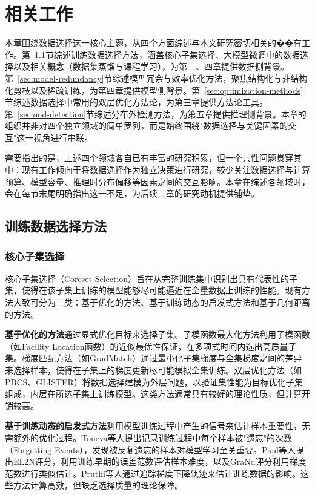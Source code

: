 \chapter{相关工作}

本章围绕数据选择这一核心主题，从四个方面综述与本文研究密切相关的��有工作。第~\ref{sec:training-data-selection}节综述训练数据选择方法，涵盖核心子集选择、大模型微调中的数据选择以及相关概念（数据集蒸馏与课程学习），为第三、四章提供数据侧背景。第~\ref{sec:model-redundancy}节综述模型冗余与效率优化方法，聚焦结构化与非结构化剪枝以及稀疏训练，为第四章提供模型侧背景。第~\ref{sec:optimization-methods}节综述数据选择中常用的双层优化方法论，为第三章提供方法论工具。第~\ref{sec:ood-detection}节综述分布外检测方法，为第五章提供推理侧背景。本章的组织并非对四个独立领域的简单罗列，而是始终围绕"数据选择与关键因素的交互"这一视角进行串联。

需要指出的是，上述四个领域各自已有丰富的研究积累，但一个共性问题贯穿其中：现有工作倾向于将数据选择作为独立决策进行研究，较少关注数据选择与计算预算、模型容量、推理时分布偏移等因素之间的交互影响。本章在综述各领域时，会在每节末尾明确指出这一不足，为后续三章的研究动机提供铺垫。


\section{训练数据选择方法}\label{sec:training-data-selection}

\subsection{核心子集选择}

核心子集选择（Coreset Selection）旨在从完整训练集中识别出具有代表性的子集，使得在该子集上训练的模型能够尽可能逼近在全量数据上训练的性能\cite{albalak2024survey}。现有方法大致可分为三类：基于优化的方法、基于训练动态的启发式方法和基于几何距离的方法。

\textbf{基于优化的方法}通过显式优化目标来选择子集。子模函数最大化方法利用子模函数（如Facility Location函数）的近似最优性保证，在多项式时间内选出高质量子集\cite{wei2015submodularity, mirzasoleiman2016fast}。梯度匹配方法（如GradMatch\cite{killamsetty2021grad}）通过最小化子集梯度与全集梯度之间的差异来选择样本，使得在子集上的梯度更新尽可能模拟全集训练。双层优化方法（如PBCS\cite{zhou2022probabilistic}、GLISTER\cite{killamsetty2021glister}）将数据选择建模为外层问题，以验证集性能为目标优化子集组成，内层在所选子集上训练模型。这类方法通常具有较好的理论性质，但计算开销较高。

\textbf{基于训练动态的启发式方法}利用模型训练过程中产生的信号来估计样本重要性，无需额外的优化过程。Toneva等人\cite{toneva2018empirical}提出记录训练过程中每个样本被"遗忘"的次数（Forgetting Events），发现被反复遗忘的样本对模型学习至关重要。Paul等人\cite{paul2021deep}提出EL2N评分，利用训练早期的误差范数评估样本难度，以及GraNd评分利用梯度范数进行类似估计。Pruthi等人\cite{pruthi2020estimating}通过追踪梯度下降轨迹来估计训练数据的影响。这些方法计算高效，但缺乏选择质量的理论保障。

